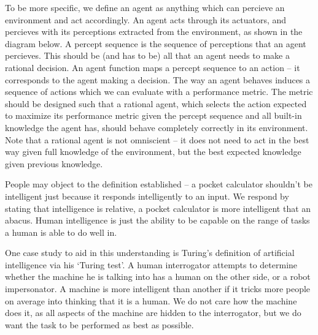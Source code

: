 \documentclass{report}
\begin{document}
To be more specific, we define an agent as anything which can percieve an environment and act accordingly. An agent acts through its actuators, and percieves with its perceptions extracted from the environment, as shown in the diagram below. A percept sequence is the sequence of perceptions that an agent percieves. This should be (and has to be) all that an agent needs to make a rational decision. An agent function maps a percept sequence to an action -- it corresponds to the agent making a decision. The way an agent behaves induces a sequence of actions which we can evaluate with a performance metric. The metric should be designed such that a rational agent, which selects the action expected to maximize its performance metric given the percept sequence and all built-in knowledge the agent has, should behave completely correctly in its environment. Note that a rational agent is not omniscient -- it does not need to act in the best way given full knowledge of the environment, but the best expected knowledge given previous knowledge.

\begin{center}
\end{center}

People may object to the definition established -- a pocket calculator shouldn't be intelligent just because it responds intelligently to an input. We respond by stating that intelligence is relative, a pocket calculator is more intelligent that an abacus. Human intelligence is just the ability to be capable on the range of tasks a human is able to do well in.

One case study to aid in this understanding is Turing's definition of artificial intelligence via his `Turing test'. A human interrogator attempts to determine whether the machine he is talking into has a human on the other side, or a robot impersonator. A machine is more intelligent than another if it tricks more people on average into thinking that it is a human. We do not care how the machine does it, as all aspects of the machine are hidden to the interrogator, but we do want the task to be performed as best as possible.
\end{document}
